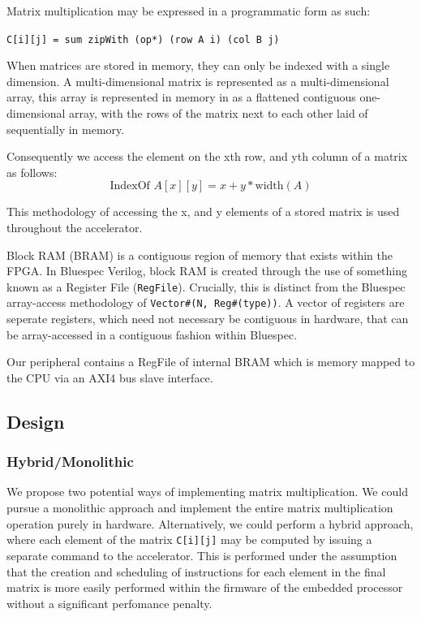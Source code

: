 \documentclass[a4paper,8pt]{report}
\begin{document}
Matrix multiplication may be expressed in a programmatic form as such:
\begin{center}
\texttt{C[i][j] = sum zipWith (op*) (row A i) (col B j)}
\end{center}
When matrices are stored in memory, they can only be indexed with a single
dimension. A multi-dimensional matrix is represented as a multi-dimensional
array, this array is represented in memory in as a flattened contiguous
one-dimensional array, with the rows of the matrix next to each other laid of
sequentially in memory.

Consequently we access the element on the xth row, and yth column of a matrix as
follows:
$$ \text{IndexOf}\,\, A[x][y] = x + y * \text{width}(A) $$

This methodology of accessing the x, and y elements of a stored matrix is used
throughout the accelerator.

Block RAM (BRAM) is a contiguous region of memory that exists within the FPGA. In
Bluespec Verilog, block RAM is created through the use of something known as a
Register File (\texttt{RegFile}). Crucially, this is distinct from the Bluespec
array-access methodology of \texttt{Vector\#(N, Reg\#(type))}. A vector of
registers are seperate registers, which need not necessary be contiguous in
hardware, that can be array-accessed in a contiguous fashion within Bluespec.

Our peripheral contains a RegFile of internal BRAM which is memory mapped to
the CPU via an AXI4 bus slave interface. 

\subsection{Design}
\subsubsection{Hybrid/Monolithic}
We propose two potential ways of implementing matrix multiplication. We could
pursue a monolithic approach and implement the entire matrix multiplication
operation purely in hardware. Alternatively, we could perform a hybrid approach,
where each element of the matrix \texttt{C[i][j]} may be computed by issuing a
separate command to the accelerator. This is performed under the assumption that the
creation and scheduling of instructions for each element in the final matrix is
more easily performed within the firmware of the embedded processor without a
significant perfomance penalty.
\end{document}

